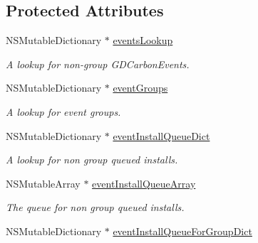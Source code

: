 \subsection*{Protected Attributes}
\begin{DoxyCompactItemize}
\item 
\hypertarget{interface_g_d_carbon_event_manager_abf0e9578e6f0fc2785ebd54aec3a2434}{
NSMutableDictionary $\ast$ \hyperlink{interface_g_d_carbon_event_manager_abf0e9578e6f0fc2785ebd54aec3a2434}{eventsLookup}}
\label{interface_g_d_carbon_event_manager_abf0e9578e6f0fc2785ebd54aec3a2434}

\begin{DoxyCompactList}\small\item\em A lookup for non-\/group GDCarbonEvents. \item\end{DoxyCompactList}\item 
\hypertarget{interface_g_d_carbon_event_manager_acbede9e9b2a73fccc030af8ee20d30d6}{
NSMutableDictionary $\ast$ \hyperlink{interface_g_d_carbon_event_manager_acbede9e9b2a73fccc030af8ee20d30d6}{eventGroups}}
\label{interface_g_d_carbon_event_manager_acbede9e9b2a73fccc030af8ee20d30d6}

\begin{DoxyCompactList}\small\item\em A lookup for event groups. \item\end{DoxyCompactList}\item 
\hypertarget{interface_g_d_carbon_event_manager_a663013a18d5f3690a29f1d099995aedb}{
NSMutableDictionary $\ast$ \hyperlink{interface_g_d_carbon_event_manager_a663013a18d5f3690a29f1d099995aedb}{eventInstallQueueDict}}
\label{interface_g_d_carbon_event_manager_a663013a18d5f3690a29f1d099995aedb}

\begin{DoxyCompactList}\small\item\em A lookup for non group queued installs. \item\end{DoxyCompactList}\item 
\hypertarget{interface_g_d_carbon_event_manager_a921afd56238f8c2c50df64a166d257bd}{
NSMutableArray $\ast$ \hyperlink{interface_g_d_carbon_event_manager_a921afd56238f8c2c50df64a166d257bd}{eventInstallQueueArray}}
\label{interface_g_d_carbon_event_manager_a921afd56238f8c2c50df64a166d257bd}

\begin{DoxyCompactList}\small\item\em The queue for non group queued installs. \item\end{DoxyCompactList}\item 
\hypertarget{interface_g_d_carbon_event_manager_af3a7570b80b6678d5b88dcb4ee139357}{
NSMutableDictionary $\ast$ \hyperlink{interface_g_d_carbon_event_manager_af3a7570b80b6678d5b88dcb4ee139357}{eventInstallQueueForGroupDict}}
\label{interface_g_d_carbon_event_manager_af3a7570b80b6678d5b88dcb4ee139357}


\end{DoxyCompactItemize}
